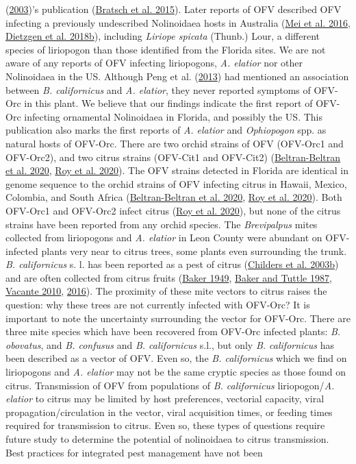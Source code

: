 \documentclass{ufdissertation}[overrideChapters] %
\begin{document}
{(\protect\hyperlink{ref-Kondo2003}{2003})'s publication (\protect\hyperlink{ref-Bratsch2015}{Bratsch et al. 2015}). Later reports of OFV described OFV infecting a previously undescribed Nolinoidaea hosts in Australia (\protect\hyperlink{ref-Mei2016}{Mei et al. 2016}, \protect\hyperlink{ref-Dietzgen2018a}{Dietzgen et al. 2018b}), including \emph{Liriope spicata} (Thunb.) Lour, a different species of liriopogon than those identified from the Florida sites. We are not aware of any reports of OFV infecting liriopogons, \emph{A. elatior} nor other Nolinoidaea in the US. Although Peng et al. (\protect\hyperlink{ref-Peng2013}{2013}) had mentioned an association between \emph{B. californicus} and \emph{A. elatior}, they never reported symptoms of OFV-Orc in this plant. We believe that our findings indicate the first report of OFV-Orc infecting ornamental Nolinoidaea in Florida, and possibly the US. This publication also marks the first reports of \emph{A. elatior} and \emph{Ophiopogon} spp. as natural hosts of OFV-Orc. There are two orchid strains of OFV (OFV-Orc1 and OFV-Orc2), and two citrus strains (OFV-Cit1 and OFV-Cit2) (\protect\hyperlink{ref-Beltran-Beltran2020}{Beltran-Beltran et al. 2020}, \protect\hyperlink{ref-Roy2020}{Roy et al. 2020}). The OFV strains detected in Florida are identical in genome sequence to the orchid strains of OFV infecting citrus in Hawaii, Mexico, Colombia, and South Africa (\protect\hyperlink{ref-Beltran-Beltran2020}{Beltran-Beltran et al. 2020}, \protect\hyperlink{ref-Roy2020}{Roy et al. 2020}). Both OFV-Orc1 and OFV-Orc2 infect citrus (\protect\hyperlink{ref-Roy2020}{Roy et al. 2020}), but none of the citrus strains have been reported from any orchid species. The \emph{Brevipalpus} mites collected from liriopogons and \emph{A. elatior} in Leon County were abundant on OFV-infected plants very near to citrus trees, some plants even surrounding the trunk. \emph{B. californicus} s. l. has been reported as a pest of citrus (\protect\hyperlink{ref-Childers2003}{Childers et al. 2003b}) and are often collected from citrus fruits (\protect\hyperlink{ref-Baker1949}{Baker 1949}, \protect\hyperlink{ref-Baker1987}{Baker and Tuttle 1987}, \protect\hyperlink{ref-Vacante2010}{Vacante 2010}, \protect\hyperlink{ref-Vacante2016}{2016}). The proximity of these mite vectors to citrus raises the question: why these trees are not currently infected with OFV-Orc? It is important to note the uncertainty surrounding the vector for OFV-Orc. There are three mite species which have been recovered from OFV-Orc infected plants: \emph{B. obovatus}, and \emph{B. confusus} and \emph{B. californicus} s.l., but only \emph{B. californicus} has been described as a vector of OFV. Even so, the \emph{B. californicus} which we find on liriopogons and \emph{A. elatior} may not be the same cryptic species as those found on citrus. Transmission of OFV from populations of \emph{B. californicus} liriopogon/\emph{A. elatior} to citrus may be limited by host preferences, vectorial capacity, viral propagation/circulation in the vector, viral acquisition times, or feeding times required for transmission to citrus. Even so, these types of questions require future study to determine the potential of nolinoidaea to citrus transmission. Best practices for integrated pest management have not been }
\end{document}

